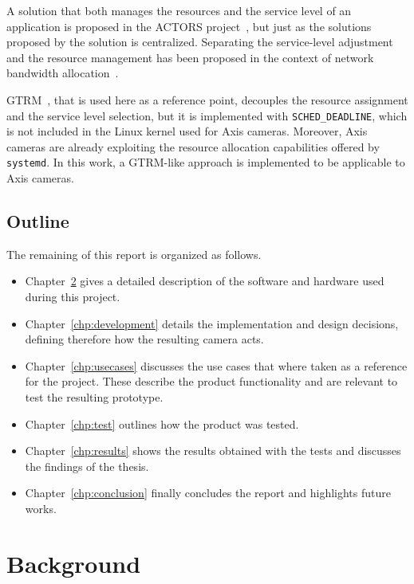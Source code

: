 \documentclass[nobiblatex]{LTHthesis}
\begin{document}
A solution that both manages the resources and the service level of an 
application is proposed in the ACTORS project~\cite{Bin11}, but just as the 
solutions proposed by \cite{Raj97a,Soj11,Arz11} the solution is centralized. 
Separating the service-level adjustment and the resource management has been proposed in the context of network bandwidth allocation~\cite{Sil11}.

GTRM~\cite{gtrm}, that is used here as a reference point, decouples the
resource assignment and the service level selection, but it is implemented
with \texttt{SCHED\_DEADLINE}, which is not included in the Linux kernel
used for Axis cameras. Moreover, Axis cameras are already exploiting the
resource allocation capabilities offered by \texttt{systemd}. In this
work, a GTRM-like approach is implemented to be applicable to Axis cameras.

\section{Outline}

The remaining of this report is organized as follows.

\begin{itemize}
\item Chapter~\ref{chp:background} gives a detailed description of
  the software and hardware used during this project.


\item Chapter~\ref{chp:development} details the implementation and design
  decisions, defining therefore how the resulting camera acts.
\item Chapter~\ref{chp:usecases} discusses the use cases that where
  taken as a reference for the project. These describe the product
  functionality and are relevant to test the resulting prototype.
\item Chapter~\ref{chp:test} outlines how the product was tested.
\item Chapter~\ref{chp:results} shows the results obtained with the
  tests and discusses the findings of the thesis.
\item Chapter~\ref{chp:conclusion} finally concludes the report and
  highlights future works.
\end{itemize}



\chapter{Background}
\label{chp:background}
\end{document}
